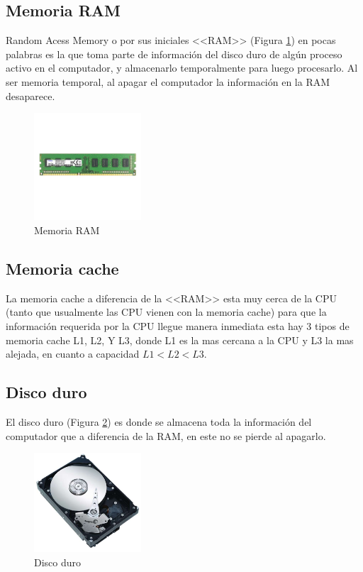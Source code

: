 \documentclass{article}
\begin{document}
\subsection{Memoria RAM}\label{RAM}
Random Acess Memory o por sus iniciales <<RAM>> (Figura \ref{fig:ram}) en pocas palabras es la que toma parte de información del disco duro de algún proceso activo en el computador, y almacenarlo temporalmente para luego procesarlo. Al ser memoria temporal, al apagar el computador la información en la RAM  desaparece.

\begin{figure}[h]
\includegraphics[width=4cm]{Images/Ram.jpg}
\centering
\caption{Memoria RAM}
\label{fig:ram}
\end{figure}

\subsection{Memoria cache}\label{cache}
La memoria cache a diferencia de la <<RAM>> esta muy cerca de la CPU (tanto que usualmente las CPU vienen con la memoria cache) para que la información requerida por la CPU llegue manera inmediata esta hay 3 tipos de memoria cache L1, L2, Y L3, donde L1 es la mas cercana a la CPU y L3 la mas alejada, en cuanto a capacidad $L1 < L2 < L3$.



\subsection{Disco duro}\label{discodurotxt}
El disco duro (Figura \ref{fig:discoduro}) es donde se almacena toda la información del computador que a diferencia de la RAM, en este no se pierde al apagarlo.

\begin{figure}[h]
\includegraphics[width=4cm]{Images/discoduro.jpg}
\centering
\caption{Disco duro}
\label{fig:discoduro}
\end{figure}
\end{document}
